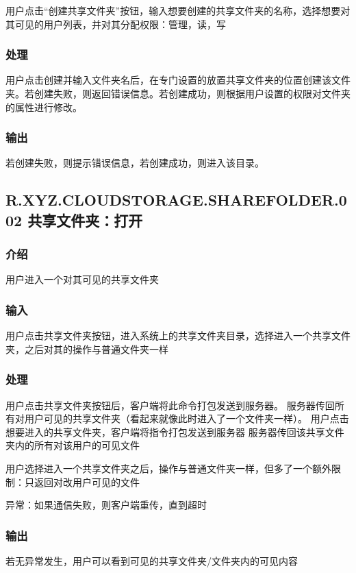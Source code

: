 用户点击“创建共享文件夹”按钮，输入想要创建的共享文件夹的名称，选择想要对其可见的用户列表，并对其分配权限：管理，读，写

\subsubsection{处理} 

用户点击创建并输入文件夹名后，在专门设置的放置共享文件夹的位置创建该文件夹。若创建失败，则返回错误信息。若创建成功，则根据用户设置的权限对文件夹的属性进行修改。

\subsubsection{输出} 

若创建失败，则提示错误信息，若创建成功，则进入该目录。


\subsection{R.XYZ.CLOUDSTORAGE.SHAREFOLDER.002 共享文件夹：打开}

\subsubsection{介绍}

用户进入一个对其可见的共享文件夹

\subsubsection{输入} 

用户点击共享文件夹按钮，进入系统上的共享文件夹目录，选择进入一个共享文件夹，之后对其的操作与普通文件夹一样

\subsubsection{处理} 

用户点击共享文件夹按钮后，客户端将此命令打包发送到服务器。
服务器传回所有对用户可见的共享文件夹（看起来就像此时进入了一个文件夹一样）。
用户点击想要进入的共享文件夹，客户端将指令打包发送到服务器
服务器传回该共享文件夹内的所有对该用户的可见文件

用户选择进入一个共享文件夹之后，操作与普通文件夹一样，但多了一个额外限制：只返回对改用户可见的文件

异常：如果通信失败，则客户端重传，直到超时
 
\subsubsection{输出} 
若无异常发生，用户可以看到可见的共享文件夹/文件夹内的可见内容

